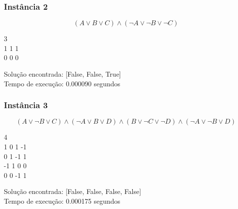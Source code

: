 \documentclass[12pt]{article}
\begin{document}
    \subsubsection{Instância 2}
        \[(A \lor B \lor C) \land (\neg A \lor \neg B \lor \neg C)\]
        \begin{tcolorbox}[title=Entrada da instância 2, width=\linewidth, 
          fontupper=\ttfamily, 
          halign=flush left]
            3 \\
            1 1 1 \\
            0 0 0 \\
        \end{tcolorbox}
        
        \begin{tcolorbox}[title=Saída da instância 2, width=\linewidth, fontupper=\ttfamily, halign=flush left]
            Solução encontrada: [False, False, True] \\
            Tempo de execução: 0.000090 segundos   \\
        \end{tcolorbox}

    \subsubsection{Instância 3}
        \[(A \lor \neg B \lor C) \land (\neg A \lor B \lor D) \land (B \lor \neg C \lor \neg D) \land (\neg A \lor \neg B \lor D)\]
        \begin{tcolorbox}[title=Entrada da instância 3, width=\linewidth, fontupper=\ttfamily,  halign=flush left]
            4 \\
            1 0 1 -1 \\
            0 1 -1 1 \\
            -1 1 0 0 \\
            0 0 -1 1 \\

        \end{tcolorbox}
        \begin{tcolorbox}[title=Saída da instância 3, width=\linewidth, fontupper=\ttfamily, halign=flush left]
            Solução encontrada: [False, False, False, False] \\
            Tempo de execução: 0.000175 segundos
        \end{tcolorbox}

\end{document}
